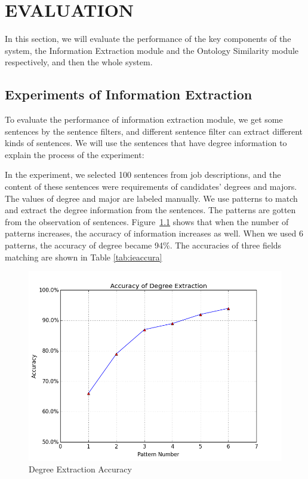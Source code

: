 \chapter{EVALUATION}

In this section, we will evaluate the performance of the key components of the system, the Information Extraction module and the Ontology Similarity module respectively, and then the whole system.

\section{Experiments of Information Extraction }

To evaluate the performance of information extraction module, we get some sentences by the sentence filters, and different sentence filter can extract different kinds of sentences. We will use the sentences that have degree information to explain the process of the experiment:

In the experiment, we selected 100 sentences from job descriptions, and the content of these sentences were requirements of candidates' degrees and majors. The values of degree and major are labeled manually. We use patterns to  match and extract the degree information from the sentences. The patterns are gotten from the observation of sentences. Figure~\ref{fig:degree_accuracy} shows that when the number of  patterns increases, the accuracy of information increases as well. When we used 6 patterns, the accuracy of degree became 94\%. The accuracies of three fields matching are shown in Table \ref{tab:ieaccura}

\begin{figure}[htbp]
  \centering
  \includegraphics[scale=0.5]{images/degree_accuracy.png}
  \caption{Degree Extraction  Accuracy}
  \label{fig:degree_accuracy}
\end{figure}


